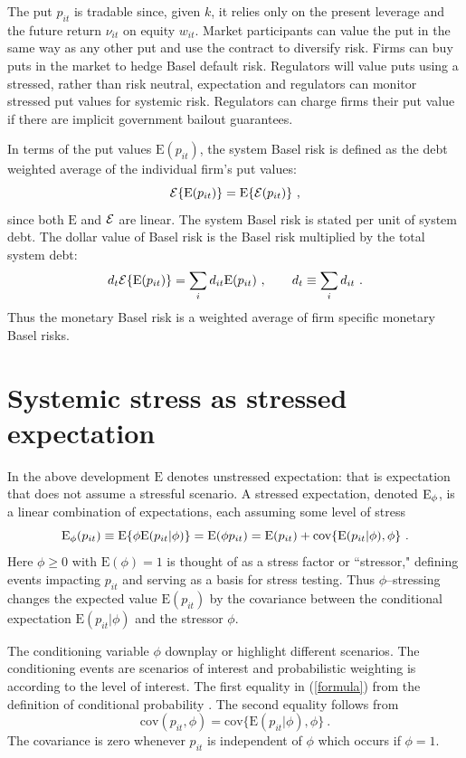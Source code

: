 \documentclass[authoryear]{elsarticle}
\newcommand{\E}{\mathrm{E}}
\newcommand{\cov}{\mathrm{cov}}
\newcommand{\Ex}{{\cal E}}
\newcommand{\eref}[1]{(\ref{#1})}
\newcommand{\cq}{\ , \qquad}
\newcommand{\be}[1]{\begin{equation}\label{#1}}
\newcommand{\ee}{\end{equation}}
\begin{document}
The put $p_{it}$ is tradable since, given $k$, it relies only on the present leverage and the future return $\nu_{it}$ on equity $w_{it}$.  Market participants can value the put in  the same way as any other put and use the contract to diversify risk.  Firms can buy puts in the market to hedge Basel default risk.    Regulators will value puts using a stressed, rather than risk neutral, expectation and regulators can monitor stressed put values for systemic risk. Regulators can charge firms their put value if there are implicit government bailout guarantees.

In terms of the put values $\E(p_{it})$, the  system Basel risk is defined as the debt weighted average of the individual firm's put values:
\be{nsrisk}
\Ex\{\E(p_{it})\} = \E\{\Ex(p_{it})\}  \ , 
\ee
since both $\E$ and $\Ex$ are linear.
The  system Basel risk is stated per unit of system debt.  The dollar value of Basel risk is the Basel risk multiplied by the total system debt:
$$
d_t\Ex\{\E(p_{it})\}  = \sum_id_{it}\E(p_{it}) \cq d_t\equiv\sum_id_{it}\ .
$$
Thus the monetary  Basel risk is a  weighted average  of firm specific monetary Basel risks.  




\section{Systemic stress as stressed expectation}

In the above development $\E$  denotes  unstressed expectation:  that is expectation that does not assume a stressful scenario.   A stressed expectation, denoted $\Es$, is a
linear combination of  expectations, each assuming some level of stress
\be{formula}
\Es(p_{it}) \equiv \E\{\phi\E(p_{it}|\phi)\} = \E(\phi p_{it}) = \E(p_{it}) + \cov\{\E(p_{it}|\phi),\phi\}\ .
\ee 
Here $\phi\ge 0$ with $\E(\phi)=1$ is thought of as a stress factor or ``stressor,"  defining events impacting $p_{it}$  and serving as a basis for stress testing.  Thus $\phi$--stressing  changes the expected value $\E(p_{it})$ by the covariance between the conditional expectation $\E(p_{it}|\phi)$  and the stressor $\phi$.

The conditioning variable $\phi$  downplay or highlight different scenarios.  The conditioning events are scenarios of interest and  probabilistic weighting is according to the level of interest.  The first equality in \eref{formula}  from the definition of conditional probability \citep{whittle2000probability}.  The second equality follows from
$$
\cov(p_{it},\phi)=\cov\{\E(p_{it}|\phi),\phi\}\ .
$$
The covariance is zero whenever  $p_{it}$ is independent of $\phi$ which occurs if $\phi=1$.
\end{document}
